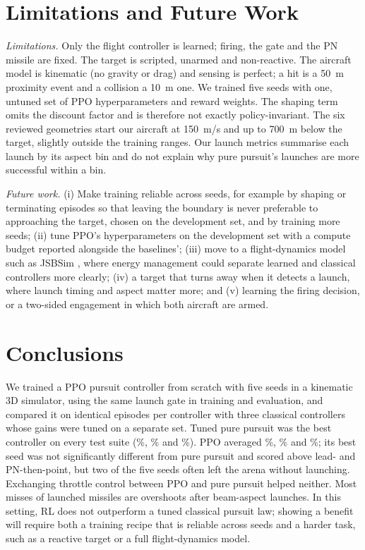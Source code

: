 \documentclass[conference]{IEEEtran}
\begin{document}
\section{Limitations and Future Work}\label{sec:limits}
\emph{Limitations.} Only the flight controller is learned; firing, the gate and the PN missile are fixed. The target is scripted, unarmed and non-reactive. The aircraft model is kinematic (no gravity or drag) and sensing is perfect; a hit is a 50~m proximity event and a collision a 10~m one. We trained five seeds with one, untuned set of PPO hyperparameters and reward weights. The shaping term omits the discount factor and is therefore not exactly policy-invariant. The six reviewed geometries start our aircraft at 150~m/s and up to 700~m below the target, slightly outside the training ranges. Our launch metrics summarise each launch by its aspect bin and do not explain why pure pursuit's launches are more successful within a bin.

\emph{Future work.} (i) Make training reliable across seeds, for example by shaping or terminating episodes so that leaving the boundary is never preferable to approaching the target, chosen on the development set, and by training more seeds; (ii) tune PPO's hyperparameters on the development set with a compute budget reported alongside the baselines'; (iii) move to a flight-dynamics model such as JSBSim \cite{berndt2004jsbsim}, where energy management could separate learned and classical controllers more clearly; (iv) a target that turns away when it detects a launch, where launch timing and aspect matter more; and (v) learning the firing decision, or a two-sided engagement in which both aircraft are armed.

\section{Conclusions}\label{sec:conclusion}
We trained a PPO pursuit controller from scratch with five seeds in a kinematic 3D simulator, using the same launch gate in training and evaluation, and compared it on \REpisodesPerRun{} identical episodes per controller with three classical controllers whose gains were tuned on a separate set. Tuned pure pursuit was the best controller on every test suite (\RPureSixRate\%, \RPureSweepRate\% and \RPureAltRate\%). PPO averaged \RPpoSixRate\%, \RPpoSweepRate\% and \RPpoAltRate\%; its best seed was not significantly different from pure pursuit and scored above lead- and PN-then-point, but two of the five seeds often left the arena without launching. Exchanging throttle control between PPO and pure pursuit helped neither. Most misses of launched missiles are overshoots after beam-aspect launches. In this setting, RL does not outperform a tuned classical pursuit law; showing a benefit will require both a training recipe that is reliable across seeds and a harder task, such as a reactive target or a full flight-dynamics model.
\end{document}

